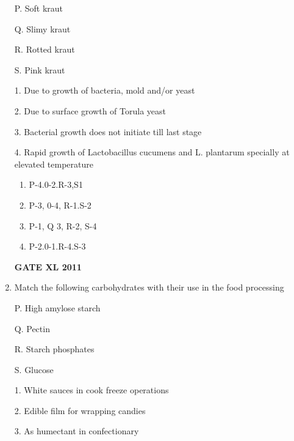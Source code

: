 \documentclass[journal,12pt,onecolumn]{IEEEtran}
\begin{document}
\begin{enumerate}
\begin{minipage}{0.5\textwidth}
\begin{flushleft}
P. Soft kraut


Q. Slimy kraut

R. Rotted kraut

S. Pink kraut

		\end{flushleft}
		\end{minipage}
	\begin{minipage}{0.5\textwidth}
		\begin{flushleft}

1. Due to growth of bacteria, mold and/or yeast

2. Due to surface growth of Torula yeast


3. Bacterial growth does not initiate till last stage


4. Rapid growth of Lactobacillus cucumens and L. plantarum specially at elevated temperature

		\end{flushleft}
		\end{minipage}

\begin{enumerate}
	\item P-4.0-2.R-3,S1
	\item P-3, 0-4, R-1.S-2
	\item P-1, Q 3, R-2, S-4
	\item P-2.0-1.R-4.S-3
\end{enumerate}
\hfill{\textbf{GATE XL 2011}}

\item {Match the following carbohydrates with their use in the food processing}



	\begin{minipage}{0.5\textwidth}
	\begin{flushleft}

P. High amylose starch

Q. Pectin

R. Starch phosphates

S. Glucose


		\end{flushleft}
		\end{minipage}
	\begin{minipage}{0.5\textwidth}
		\begin{flushleft}

1. White sauces in cook freeze operations

2. Edible film for wrapping candies


3. As humectant in confectionary


\end{flushleft}
\end{minipage}
\end{enumerate}
\end{document}
